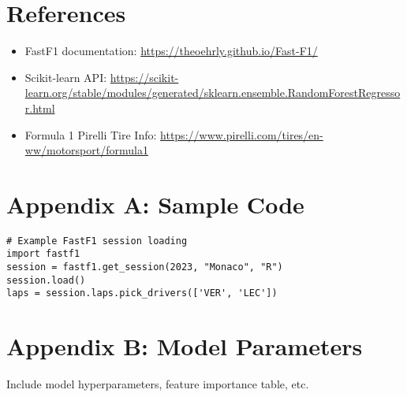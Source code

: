 \documentclass[12pt]{article}
\begin{document}
\section*{References}
\begin{itemize}
    \item FastF1 documentation: \url{https://theoehrly.github.io/Fast-F1/}
    \item Scikit-learn API: \url{https://scikit-learn.org/stable/modules/generated/sklearn.ensemble.RandomForestRegressor.html}
    \item Formula 1 Pirelli Tire Info: \url{https://www.pirelli.com/tires/en-ww/motorsport/formula1}
\end{itemize}

\appendix
\section{Appendix A: Sample Code}
\begin{verbatim}
# Example FastF1 session loading
import fastf1
session = fastf1.get_session(2023, "Monaco", "R")
session.load()
laps = session.laps.pick_drivers(['VER', 'LEC'])
\end{verbatim}

\section{Appendix B: Model Parameters}
Include model hyperparameters, feature importance table, etc.
\end{document}
